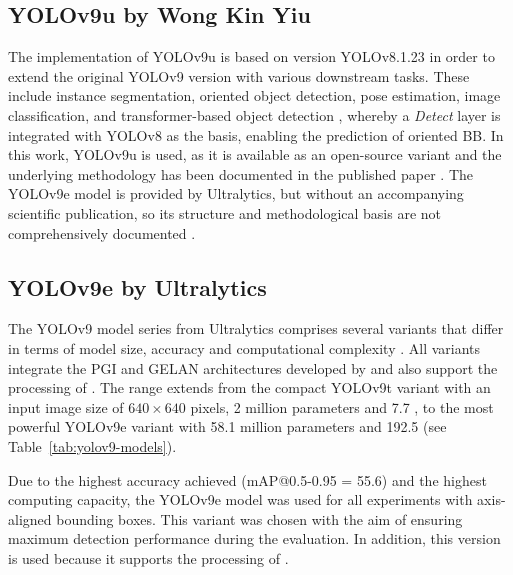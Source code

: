 \subsection{YOLOv9u by Wong Kin Yiu}
\label{subsec:yolov9u}

The implementation of \acrshort{YOLO}v9u is based on version \acrshort{YOLO}v8.1.23 \cite{yolo_v9u_github} in order to extend the original \acrshort{YOLO}v9 version with various downstream tasks. These include instance segmentation, oriented object detection, pose estimation, image classification, and transformer-based object detection \cite{wang2024}, whereby a \textit{Detect} layer is integrated with \acrshort{YOLO}v8 as the basis, enabling the prediction of oriented \acrshort{BB}. In this work, \acrshort{YOLO}v9u is used, as it is available as an open-source variant and the underlying methodology has been documented in the published paper \cite{wang2024_sapkota}. The \acrshort{YOLO}v9e model is provided by Ultralytics, but without an accompanying scientific publication, so its structure and methodological basis are not comprehensively documented \cite{ultralyics_2023}.
 



\subsection{YOLOv9e by Ultralytics}
\label{subsec:yolov9e}

The \acrshort{YOLO}v9 model series from Ultralytics comprises several variants that differ in terms of model size, accuracy and computational complexity \cite{ultralyics_yolov9}. All variants integrate the \acrshort{PGI} and \acrshort{GELAN} architectures developed by \citeauthor{wang2024_sapkota} \cite{wang2024_sapkota} and also support the processing of . The range extends from the compact \acrshort{YOLO}v9t variant with an input image size of $640 \times 640$ pixels, 2 million parameters and 7.7 , to the most powerful \acrshort{YOLO}v9e variant with 58.1 million parameters and 192.5  (see Table~\ref{tab:yolov9-models}).

Due to the highest accuracy achieved (\acrshort{mAP}@0.5-0.95 = 55.6) and the highest computing capacity, the \acrshort{YOLO}v9e model was used for all experiments with axis-aligned bounding boxes. This variant was chosen with the aim of ensuring maximum detection performance during the evaluation. In addition, this version is used because it supports the processing of .




